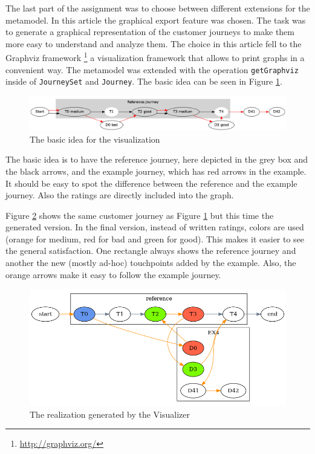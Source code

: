 \documentclass[12pt]{scrartcl}
\begin{document}
The last part of the assignment was to choose between different extensions for the metamodel. In this article
the graphical export feature was chosen. The task was to generate a graphical representation of the customer
journeys to make them more easy to understand and analyze them. The choice in this article fell to the Graphviz framework 
\footnote{\url{http://graphviz.org/}} a visualization framework that allows to print graphs in a convenient way.
The metamodel was extended with the operation \lstinline!getGraphviz! inside of \lstinline!JourneySet! and
\lstinline!Journey!. The basic idea can be seen in Figure \ref{figure:sample_figure}.

\begin{figure}[hbtp]
	\centering
	\includegraphics[scale=0.33]{img/sample_journey1.png}
	\caption{The basic idea for the visualization}
	\label{figure:sample_figure}
\end{figure}

The basic idea is to have the reference journey, here depicted in the grey box and the black arrows, and the 
example journey, which has red arrows in the example. It should be easy to spot the difference between the
reference and the example journey. Also the ratings are directly included into the graph.

Figure \ref{figure:sample_figure2} shows the same customer journey as Figure \ref{figure:sample_figure} but this
time the generated version. In the final version, instead of written ratings, colors are used (orange for
medium, red for bad and green for good). This makes it easier to see the general satisfaction. One rectangle always
shows the reference journey and another the new (mostly ad-hoc) touchpoints added by the example. Also, the orange
arrows make it easy to follow the example journey.

\begin{figure}[hbtp]
	\centering
	\includegraphics[scale=0.5]{img/sample_journey2.png}
	\caption{The realization generated by the Visualizer}
	\label{figure:sample_figure2}
\end{figure}
\end{document}
